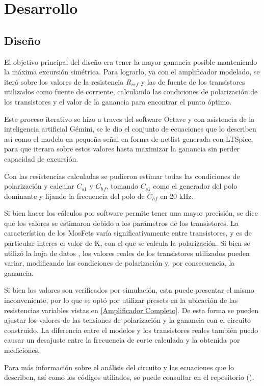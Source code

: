 \section{Desarrollo}

\subsection{Diseño}

El objetivo principal del diseño era tener la mayor ganancia posible manteniendo la máxima excursión simétrica. Para lograrlo, ya con el amplificador modelado, se iteró sobre los valores de la resistencia $R_{ref}$ y las de fuente de los transistores utilizados como fuente de corriente, calculando las condiciones de polarización de los transistores y el valor de la ganancia para encontrar el punto óptimo.

Este proceso iterativo se hizo a traves del software Octave y con asistencia de la inteligencia artificial Gémini, se le dio el conjunto de ecuaciones que lo describen así como el modelo en pequeña señal en forma de netlist generada con LTSpice, para que iterara sobre estos valores hasta maximizar la ganancia sin perder capacidad de excursión.

Con las resistencias calculadas se pudieron estimar todas las condiciones de polarización y calcular $C_{s1}$ y $C_{hf}$, tomando $C_{s1}$ como el generador del polo dominante y fijando la frecuencia del polo de $C_{hf}$ en 20 kHz.

Si bien hacer los cálculos por software permite tener una mayor precisión, se dice que los valores se estimaron debido a los parámetros de los transistores. La característica de los MosFets varía significativamente entre transistores, y es de particular interes el valor de K, con el que se calcula la polarización. Si bien se utilizó la hoja de datos \cite{2N7000}, los valores reales de los transistores utilizados pueden variar, modificando las condiciones de polarización y, por consecuencia, la ganancia.

Si bien los valores son verificados por simulación, esta puede presentar el mismo inconveniente, por lo que se optó por utilizar presets en la ubicación de las resistencias variables vistas en \ref{Amplificador Completo}. De esta forma se pueden ajustar los valores de las tensiones de polarización y la ganancia con el circuito construido. La diferencia entre el modelos y los transistores reales también puedo causar un desajuste entre la frecuencia de corte calculada y la obtenida por mediciones.

Para más información sobre el análisis del circuito y las ecuaciones que lo describen, así como los códigos utiliados, se puede consultar en el repositorio (\cite{Repositorio}).







